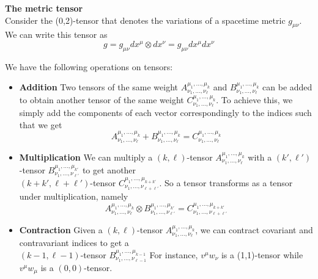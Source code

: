 \documentclass{article}
\begin{document}
 			\pagebreak
 			
 			\begin{exmp}
 				\textbf{The metric tensor}\\
 				Consider the (0,2)-tensor that denotes the variations of a spacetime metric $g_{\mu\nu}$. We can write this tensor as
 				\begin{equation}
 					\label{eq:MetricTensor}
 					\boxed{g = g_{\mu\nu} dx^\mu \otimes dx^\nu = g_{\mu \nu} dx^\mu dx^\nu}
 				\end{equation}
 			\end{exmp}
 			We have the following operations on tensors:
 			\begin{itemize}
 				\item \textbf{Addition}
 					\subitem Two tensors of the same weight $A_{\nu_1, \dots, \nu_\ell}^{\mu_1, \dots, \mu_k}$ and $B_{\nu_1, \dots, \nu_\ell}^{\mu_1, \dots, \mu_k}$ can be added to obtain another tensor of the same weight $C_{\nu_1, \dots, \nu_\ell}^{\mu_1, \dots, \mu_k}$. To achieve this, we simply add the components of each vector correspondingly to the indices such that we get
 					$$ A_{\nu_1, \dots, \nu_\ell}^{\mu_1, \dots, \mu_k} + B_{\nu_1, \dots, \nu_\ell}^{\mu_1, \dots, \mu_k} = C_{\nu_1, \dots, \nu_\ell}^{\mu_1, \dots, \mu_k}$$
 				\item \textbf{Multiplication}
 					\subitem We can multiply a $(k, \ell)$-tensor $A_{\nu_1, \dots, \nu_\ell}^{\mu_1, \dots, \mu_k}$ with a $(k', \ell')$-tensor $B_{\nu_1, \dots, \nu_{\ell'}}^{\mu_1, \dots, \mu_{k'}}$  to get another\\$(k+k',\ell + \ell')$-tensor $C_{\nu_1, \dots, \nu_{\ell+\ell'}}^{\mu_1, \dots, \mu_{k+k'}}$. So a tensor transforms as a tensor under multiplication, namely
 					$$ A_{\nu_1, \dots, \nu_\ell}^{\mu_1, \dots, \mu_k}\otimes B_{\nu_1, \dots, \nu_{\ell'}}^{\mu_1, \dots, \mu_{k'}} = C_{\nu_1, \dots, \nu_{\ell+\ell'}}^{\mu_1, \dots, \mu_{k+k'}}$$
 				\item \textbf{Contraction}
 					\subitem Given a $(k, \ell)$-tensor $A_{\nu_1, \dots, \nu_\ell}^{\mu_1, \dots, \mu_k}$, we can contract covariant and contravariant indices to get a \\$(k-1, \ell-1)$-tensor  $B_{\nu_1, \dots, \nu_{\ell-1}}^{\mu_1, \dots, \mu_{k-1}}$
 					For instance, $v^\mu w_\nu$ is a (1,1)-tensor while $v^\mu w_\mu$ is a $(0,0)$-tensor.
 			\end{itemize}
\end{document}
